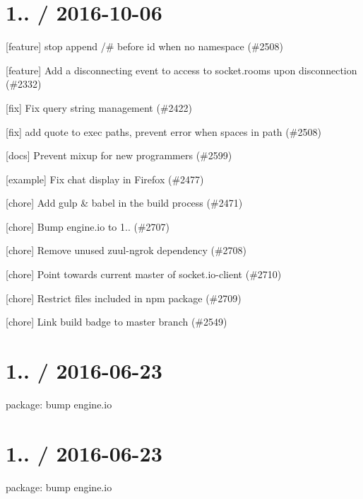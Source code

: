 \section*{1.. / 2016-\/10-\/06 }


\begin{DoxyItemize}
\item \mbox{[}feature\mbox{]} stop append /\# before id when no namespace (\#2508)
\item \mbox{[}feature\mbox{]} Add a \textquotesingle{}disconnecting\textquotesingle{} event to access to socket.\+rooms upon disconnection (\#2332)
\item \mbox{[}fix\mbox{]} Fix query string management (\#2422)
\item \mbox{[}fix\mbox{]} add quote to exec paths, prevent error when spaces in path (\#2508)
\item \mbox{[}docs\mbox{]} Prevent mixup for new programmers (\#2599)
\item \mbox{[}example\mbox{]} Fix chat display in Firefox (\#2477)
\item \mbox{[}chore\mbox{]} Add gulp \& babel in the build process (\#2471)
\item \mbox{[}chore\mbox{]} Bump engine.\+io to 1.. (\#2707)
\item \mbox{[}chore\mbox{]} Remove unused zuul-\/ngrok dependency (\#2708)
\item \mbox{[}chore\mbox{]} Point towards current master of socket.\+io-\/client (\#2710)
\item \mbox{[}chore\mbox{]} Restrict files included in npm package (\#2709)
\item \mbox{[}chore\mbox{]} Link build badge to master branch (\#2549)
\end{DoxyItemize}

\section*{1.. / 2016-\/06-\/23 }


\begin{DoxyItemize}
\item package\+: bump {\ttfamily engine.\+io}
\end{DoxyItemize}

\section*{1.. / 2016-\/06-\/23 }


\begin{DoxyItemize}
\item package\+: bump {\ttfamily engine.\+io}
\end{DoxyItemize}

